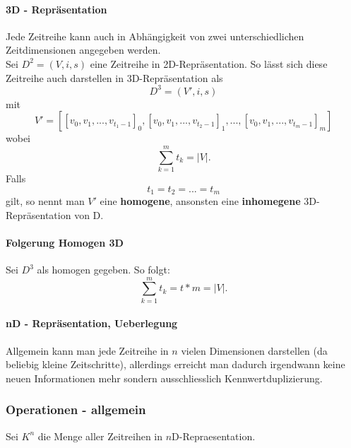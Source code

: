 \documentclass[12pt]{article}
\begin{document}
			\paragraph{3D - Repräsentation}
				Jede Zeitreihe kann auch in Abhängigkeit von zwei unterschiedlichen Zeitdimensionen angegeben werden. \\[0,3cm]
				Sei $D^{2} = (V, i, s)$ eine Zeitreihe in 2D-Repräsentation. So lässt sich diese Zeitreihe auch darstellen in 3D-Repräsentation als
				\begin{equation}
					D^{3} = (V', i, s)
				\end{equation}
				mit
				\begin{equation}
					V' = [[v_{0}, v_{1}, ..., v_{t_{1} - 1}]_{0},[v_{0}, v_{1}, ..., v_{t_{2} - 1}]_{1},...,[v_{0}, v_{1}, ..., v_{t_{m} - 1}]_{m}]
				\end{equation}
				wobei 
				\begin{equation}
					\sum_{k=1}^{m}t_{k} = |V|.
				\end{equation}
				Falls
				\begin{equation}
					t_{1}=t_{2}=...=t_{m}
				\end{equation}
				gilt, so nennt man $V'$ eine \textbf{homogene}, ansonsten eine \textbf{inhomegene} 3D-Repräsentation von D.
			\paragraph{Folgerung Homogen 3D}
				Sei $D^{3}$ als homogen gegeben. So folgt:
				\begin{equation}
					\sum_{k=1}^{m}t_{k} = t*m = |V|.
				\end{equation}
				
			\paragraph{nD - Repräsentation, Ueberlegung}
				Allgemein kann man jede Zeitreihe in $n$ vielen Dimensionen darstellen (da beliebig kleine Zeitschritte), allerdings erreicht man dadurch irgendwann keine neuen Informationen mehr sondern ausschliesslich Kennwertduplizierung.
		\subsubsection{Operationen - allgemein}
			Sei $K^{n}$ die Menge aller Zeitreihen in $n$D-Repraesentation.		
		
\end{document}
